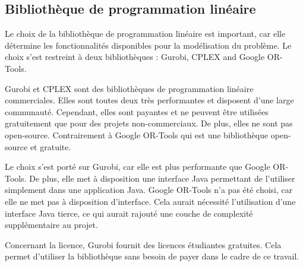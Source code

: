 \subsection{Bibliothèque de programmation linéaire}
Le choix de la bibliothèque de programmation linéaire est important, car elle détermine les fonctionnalités disponibles pour la modélisation du problème. Le choix s'est restreint à deux bibliothèques : Gurobi, CPLEX and Google OR-Tools.

Gurobi et CPLEX sont des bibliothèques de programmation linéaire commerciales. Elles sont toutes deux très performantes et disposent d'une large communauté. Cependant, elles sont payantes et ne peuvent être utilisées gratuitement que pour des projets non-commerciaux. De plus, elles ne sont pas open-source. Contrairement à Google OR-Tools qui est une bibliothèque open-source et gratuite.

Le choix s'est porté sur Gurobi, car elle est plus performante que Google OR-Tools. De plus, elle met à disposition une interface Java permettant de l'utiliser simplement dans une application Java. Google OR-Tools n'a pas été choisi, car elle ne met pas à disposition d'interface. Cela aurait nécessité l'utilisation d'une interface Java tierce, ce qui aurait rajouté une couche de complexité supplémentaire au projet.

Concernant la licence, Gurobi fournit des licences étudiantes gratuites. Cela permet d'utiliser la bibliothèque sans besoin de payer dans le cadre de ce travail.